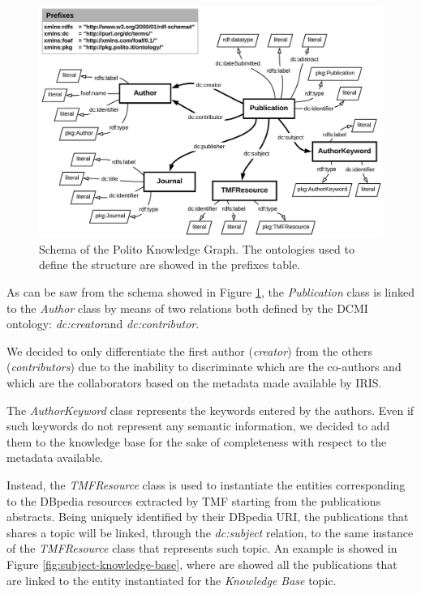 \documentclass[%
    corpo=13.5pt,
    twoside,
    oldstyle,
    tipotesi=magistrale,
    greek,
    evenboxes
]{toptesi}
\begin{document}
\begin{figure}[h]
    \centering
    \includegraphics[scale=0.85]{img/schema.png}
    \caption{Schema of the Polito Knowledge Graph. The ontologies used to
    define the structure are showed in the prefixes table.}
    \label{fig:schema}
\end{figure}

As can be saw from the schema showed in Figure \ref{fig:schema}, the
\emph{Publication} class is linked to the \emph{Author} class by means of two
relations both defined by the DCMI ontology:
\emph{dc:creator}\footnotemark and \emph{dc:contributor}\footnotemark[\value{footnote}].

We decided to only differentiate the first author (\emph{creator}) from
the others (\emph{contributors}) due to the inability to discriminate which are
the co-authors and which are the collaborators based on the metadata made
available by IRIS.

The \emph{AuthorKeyword} class represents the keywords entered by the authors.
Even if such keywords do not represent any semantic information, we decided to
add them to the knowledge base for the sake of completeness with respect to
the metadata available.

Instead, the \emph{TMFResource} class is used to instantiate the entities
corresponding to the DBpedia resources extracted by TMF starting from the
publications abstracts.
Being uniquely identified by their DBpedia URI, the publications that shares
a topic will be linked, through the \emph{dc:subject} relation, to the same
instance of the \emph{TMFResource} class that represents such topic.
An example is showed in Figure \ref{fig:subject-knowledge-base}, where are
showed all the publications that are linked to the entity instantiated for
the \emph{Knowledge Base} topic.
\end{document}
